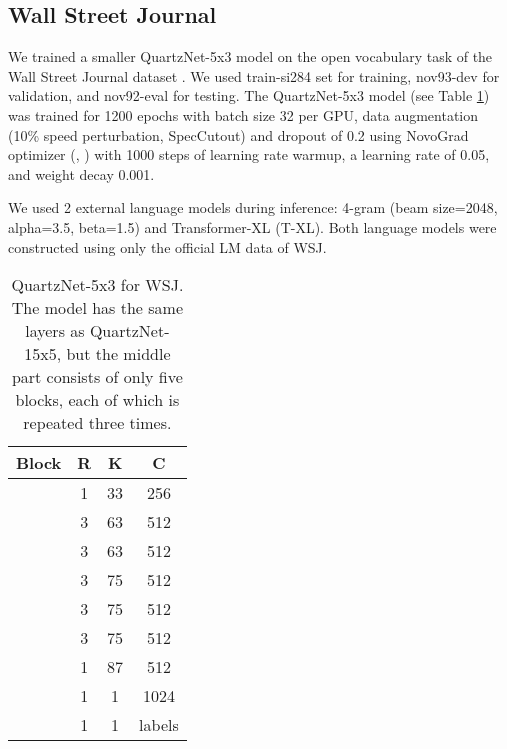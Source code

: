 \documentclass{article}
\begin{document}
\begin{table}[!ht]
\centering
\caption{QuartzNet-15x5: large batch training on LibriSpeech, time to train (hours) and greedy WER ().}
\vspace{4pt}
\label{tab:librispeech_largebatch}
\centering
{}
\end{table}

\subsection{Wall Street Journal}
We trained a smaller QuartzNet-5x3 model on the open vocabulary task of the Wall Street Journal dataset \cite{wsj}. 
We used train-si284 set for training, nov93-dev for validation, and nov92-eval for testing. 
The QuartzNet-5x3 model (see Table \ref{tab:WSJ_Architecture}) was trained for 1200 epochs with batch size 32 per GPU, data augmentation (10\% speed perturbation, SpecCutout)  and dropout of 0.2 using NovoGrad optimizer (, ) with 1000 steps of learning rate warmup, a learning rate of 0.05, and weight decay 0.001. 

We used 2 external language models during inference: 4-gram (beam size=2048, alpha=3.5, beta=1.5) and Transformer-XL (T-XL). Both language models were constructed using only the official LM data of WSJ.

\begin{table}[thb]
\caption{QuartzNet-5x3 for WSJ. The model has the same layers  as QuartzNet-15x5, but the middle part consists of only five blocks, each of which is repeated three times.}
\vspace{4pt}
\label{tab:WSJ_Architecture}
\centering
\scalebox{1.0}
{
\begin{tabular}{c c c c } 
 \hline
   \textbf{Block} & \textbf{R} & \textbf{K} & \textbf{C} \\
 \hline
  & 1 & 33 & 256 \\
 \hline
  & 3 & 63 & 512 \\
  & 3 & 63 & 512 \\
  & 3 & 75 & 512 \\
  & 3 & 75 & 512 \\
  & 3 & 75 & 512 \\
 \hline
  & 1 & 87 & 512 \\
  & 1 & 1 & 1024 \\
  & 1 & 1 & labels  \\
 \hline
\end{tabular}
}
\end{table}
\end{document}

